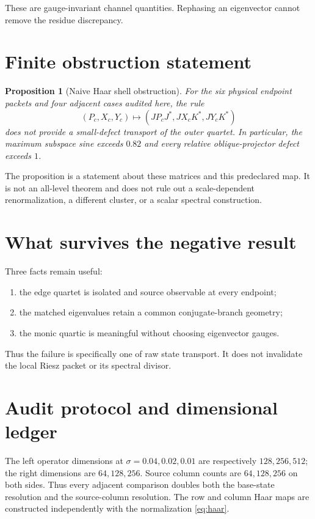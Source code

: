 \documentclass[12pt]{article}
\newtheorem{proposition}[theorem]{Proposition}
\theoremstyle{remark}
\begin{document}
These are gauge-invariant channel quantities.  Rephasing an eigenvector
cannot remove the residue discrepancy.

\section{Finite obstruction statement}

\begin{proposition}[Naive Haar shell obstruction]\label{prop:obstruction}
For the six physical endpoint packets and four adjacent cases audited here,
the rule
\begin{equation*}
 (P_c,X_c,Y_c)\longmapsto
 (JP_cJ^*,JX_cK^*,JY_cK^*)
\end{equation*}
does not provide a small-defect transport of the outer quartet.  In
particular, the maximum subspace sine exceeds $0.82$ and every relative
oblique-projector defect exceeds $1$.
\end{proposition}

The proposition is a statement about these matrices and this predeclared
map.  It is not an all-level theorem and does not rule out a scale-dependent
renormalization, a different cluster, or a scalar spectral construction.

\section{What survives the negative result}

Three facts remain useful:
\begin{enumerate}[leftmargin=2em]
\item the edge quartet is isolated and source observable at every endpoint;
\item the matched eigenvalues retain a common conjugate-branch geometry;
\item the monic quartic is meaningful without choosing eigenvector gauges.
\end{enumerate}
Thus the failure is specifically one of raw state transport.  It does not
invalidate the local Riesz packet or its spectral divisor.

\section{Audit protocol and dimensional ledger}

The left operator dimensions at $\sigma=0.04,0.02,0.01$ are respectively
$128,256,512$; the right dimensions are $64,128,256$.  Source column counts
are $64,128,256$ on both sides.  Thus every adjacent comparison doubles both
the base-state resolution and the source-column resolution.  The row and
column Haar maps are constructed independently with the normalization
\eqref{eq:haar}.
\end{document}
